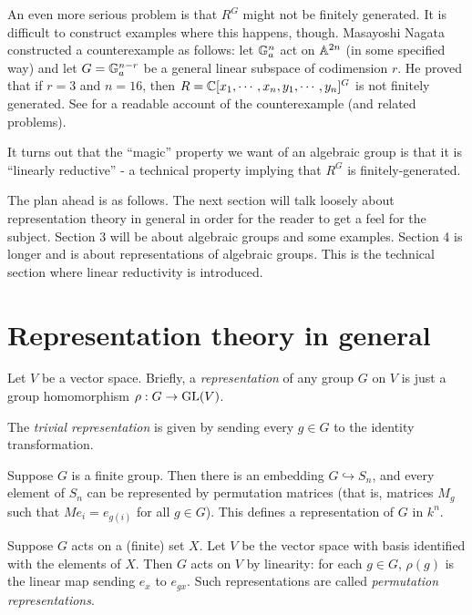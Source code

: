 \documentclass[11pt, english]{article}
\begin{document}
\begin{example}
An even more serious problem is that $R^G$ might not be finitely generated. It is difficult to construct examples where this happens, though. Masayoshi Nagata constructed a counterexample as follows: let $\mathbb{G}_a^n$ act on $\mathbb{A}^{2n}$ (in some specified way) and let $G = \mathbb{G}_a^{n-r}$ be a general linear subspace of codimension $r$. He proved that if $r=3$ and $n=16$, then $R=\mathbb{C}[x_1,\cdots,x_n,y_1,\cdots,y_n]^G$ is not finitely generated. See \cite{mckernan_moridream} for a readable account of the counterexample (and related problems).
\end{example}

It turns out that the ``magic'' property we want of an algebraic group is that it is ``linearly reductive'' - a technical property implying that $R^G$ is finitely-generated.

The plan ahead is as follows. The next section will talk loosely about representation theory in general in order for the reader to get a feel for the subject. Section 3 will be about algebraic groups and some examples. Section 4 is longer and is about representations of algebraic groups. This is the technical section where linear reductivity is introduced.


\section{Representation theory in general}

Let $V$ be a vector space. Briefly, a \emph{representation} of any group $G$ on $V$ is just a group homomorphism $\rho:G \to \operatorname{GL}(V)$.

\begin{example}
The \emph{trivial representation} is given by sending every $g \in G$ to the identity transformation.
\end{example}

\begin{example}
Suppose $G$ is a finite group. Then there is an embedding $G \hookrightarrow S_n$, and every element of $S_n$ can be represented by permutation matrices (that is, matrices $M_g$ such that $Me_i=e_{g(i)}$ for all $g \in G$). This defines a representation of $G$ in $k^n$.
\end{example}

\begin{example}
Suppose $G$ acts on a (finite) set $X$. Let $V$ be the vector space with basis identified with the elements of $X$. Then $G$ acts on $V$ by linearity: for each $g \in G$, $\rho(g)$ is the linear map sending $e_x$ to $e_{gx}$. Such representations are called \emph{permutation representations}.
\end{example}
\end{document}

